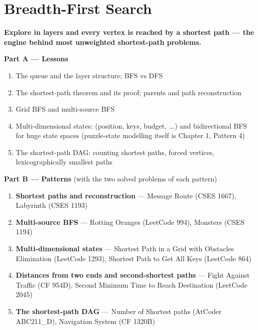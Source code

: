 \chapter{Breadth-First Search}
\label{ch:bfs}

\begin{tcolorbox}[enhanced, colback=white, colframe=secondaryblue, boxrule=1pt, arc=2mm]
\textbf{\large\textcolor{primaryblue}{Explore in layers and every vertex is reached by a shortest path --- the engine behind most unweighted shortest-path problems.}}
\end{tcolorbox}


\begin{plannedbox}
\textbf{Part A --- Lessons}
\begin{enumerate}[leftmargin=*, label=\textbf{A\arabic*.}, itemsep=1pt]
    \item The queue and the layer structure; BFS vs DFS
    \item The shortest-path theorem and its proof; parents and path reconstruction
    \item Grid BFS and multi-source BFS
    \item Multi-dimensional states: (position, keys, budget, ...) and bidirectional BFS for huge state spaces (puzzle-state modelling itself is Chapter 1, Pattern 4)
    \item The shortest-path DAG: counting shortest paths, forced vertices, lexicographically smallest paths
\end{enumerate}
\textbf{Part B --- Patterns} (with the two solved problems of each pattern)
\begin{enumerate}[leftmargin=*, label=\textbf{P\arabic*.}, itemsep=1pt]
    \item \textbf{Shortest paths and reconstruction} --- Message Route {\small\color{darkgray}(CSES 1667)}, Labyrinth {\small\color{darkgray}(CSES 1193)}
    \item \textbf{Multi-source BFS} --- Rotting Oranges {\small\color{darkgray}(LeetCode 994)}, Monsters {\small\color{darkgray}(CSES 1194)}
    \item \textbf{Multi-dimensional states} --- Shortest Path in a Grid with Obstacles Elimination {\small\color{darkgray}(LeetCode 1293)}, Shortest Path to Get All Keys {\small\color{darkgray}(LeetCode 864)}
    \item \textbf{Distances from two ends and second-shortest paths} --- Fight Against Traffic {\small\color{darkgray}(CF 954D)}, Second Minimum Time to Reach Destination {\small\color{darkgray}(LeetCode 2045)}
    \item \textbf{The shortest-path DAG} --- Number of Shortest paths {\small\color{darkgray}(AtCoder ABC211\_D)}, Navigation System {\small\color{darkgray}(CF 1320B)}
\end{enumerate}
\end{plannedbox}
